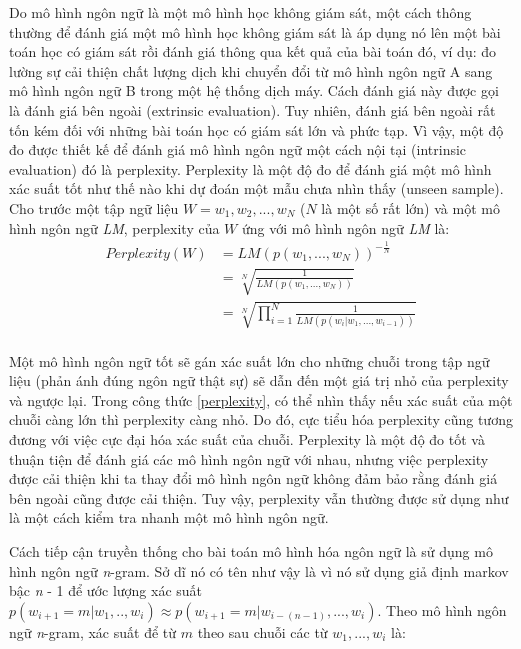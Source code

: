 Do mô hình ngôn ngữ là một mô hình học không giám sát, một cách thông thường để đánh giá một mô hình học không giám sát là áp dụng nó lên một bài toán học có giám sát rồi đánh giá thông qua kết quả của bài toán đó, ví dụ: đo lường sự cải thiện chất lượng dịch khi chuyển đổi từ mô hình ngôn ngữ A sang mô hình ngôn ngữ B trong một hệ thống dịch máy. Cách đánh giá này được gọi là đánh giá bên ngoài (extrinsic evaluation). Tuy nhiên, đánh giá bên ngoài rất tốn kém đối với những bài toán học có giám sát lớn và phức tạp. Vì vậy, một độ đo được thiết kế để đánh giá mô hình ngôn ngữ một cách nội tại (intrinsic evaluation) đó là perplexity. Perplexity là một độ đo để đánh giá một mô hình xác suất tốt như thế nào khi dự đoán một mẫu chưa nhìn thấy (unseen sample). Cho trước một tập ngữ liệu $ W = w_1, w_2, ..., w_N$ ($N$ là một số rất lớn) và một mô hình ngôn ngữ \textit{LM}, perplexity của $W$ ứng với mô hình ngôn ngữ \textit{LM} là:
\begin{equation} \label{perplexity}
\begin{split}
Perplexity(W) &= LM \left(p(w_1,...,w_N) \right)^{-\frac{1}{N}} \\
			  &= \sqrt[N]{\frac{1}{LM(p(w_1,...,w_N))}} \\
			  &= \sqrt[N]{\prod_{i=1}^{N}  \frac{1}{LM(p(w_i|w_1,...,w_{i-1}))}} \\
\end{split}
\end{equation}

Một mô hình ngôn ngữ tốt sẽ gán xác suất lớn cho những chuỗi trong tập ngữ liệu (phản ánh đúng ngôn ngữ thật sự) sẽ dẫn đến một giá trị nhỏ của perplexity và ngược lại. Trong công thức \ref{perplexity}, có thể nhìn thấy nếu xác suất của một chuỗi càng lớn thì perplexity càng nhỏ. Do đó, cực tiểu hóa perplexity cũng tương đương với việc cực đại hóa xác suất của chuỗi. Perplexity là một độ đo tốt và thuận tiện để đánh giá các mô hình ngôn ngữ với nhau, nhưng việc perplexity được cải thiện khi ta thay đổi mô hình ngôn ngữ không đảm bảo rằng đánh giá bên ngoài cũng được cải thiện. Tuy vậy, perplexity vẫn thường được sử dụng như là một cách kiểm tra nhanh một mô hình ngôn ngữ. 

Cách tiếp cận truyền thống cho bài toán mô hình hóa ngôn ngữ là sử dụng mô hình ngôn ngữ \textit{n}-gram. Sở dĩ nó có tên như vậy là vì nó sử dụng giả định markov bậc \textit{n} - 1 để ước lượng xác suất $p \left(w_{i+1}=m|w_1,..,w_i \right) \approx p \left(w_{i+1}=m|w_{i-(n-1)},...,w_i \right)$. Theo mô hình ngôn ngữ \textit{n}-gram, xác suất để từ $m$ theo sau chuỗi các từ $w_1,...,w_{i}$ là:

